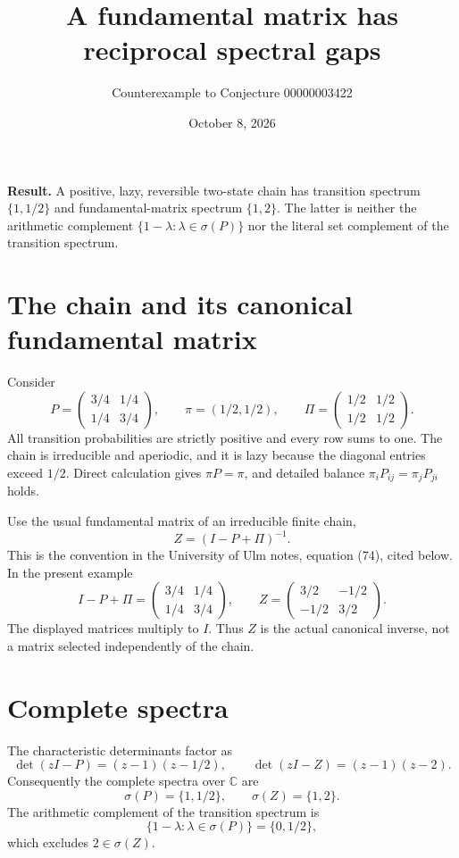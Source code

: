\documentclass[11pt]{article}
\title{A fundamental matrix has reciprocal spectral gaps}
\author{Counterexample to Conjecture 00000003422}
\date{October 8, 2026}
\begin{document}
\maketitle
\noindent\textbf{Result.} A positive, lazy, reversible two-state chain has transition spectrum $\{1,1/2\}$ and fundamental-matrix spectrum $\{1,2\}$. The latter is neither the arithmetic complement $\{1-\lambda:\lambda\in\sigma(P)\}$ nor the literal set complement of the transition spectrum.

\section*{The chain and its canonical fundamental matrix}
Consider
\[
 P=\begin{pmatrix}3/4&1/4\\1/4&3/4\end{pmatrix},\qquad
 \pi=(1/2,1/2),\qquad
 \Pi=\begin{pmatrix}1/2&1/2\\1/2&1/2\end{pmatrix}.
\]
All transition probabilities are strictly positive and every row sums to one. The chain is irreducible and aperiodic, and it is lazy because the diagonal entries exceed $1/2$. Direct calculation gives $\pi P=\pi$, and detailed balance $\pi_iP_{ij}=\pi_jP_{ji}$ holds.

Use the usual fundamental matrix of an irreducible finite chain,
\[
 Z=(I-P+\Pi)^{-1}.
\]
This is the convention in the University of Ulm notes, equation (74), cited below. In the present example
\[
 I-P+\Pi=\begin{pmatrix}3/4&1/4\\1/4&3/4\end{pmatrix},\qquad
 Z=\begin{pmatrix}3/2&-1/2\\-1/2&3/2\end{pmatrix}.
\]
The displayed matrices multiply to $I$. Thus $Z$ is the actual canonical inverse, not a matrix selected independently of the chain.

\section*{Complete spectra}
The characteristic determinants factor as
\[
 \det(zI-P)=(z-1)(z-1/2),\qquad
 \det(zI-Z)=(z-1)(z-2).
\]
Consequently the complete spectra over $\mathbb C$ are
\[
 \sigma(P)=\{1,1/2\},\qquad \sigma(Z)=\{1,2\}.
\]
The arithmetic complement of the transition spectrum is
\[
 \{1-\lambda:\lambda\in\sigma(P)\}=\{0,1/2\},
\]
which excludes $2\in\sigma(Z)$.
\end{document}
